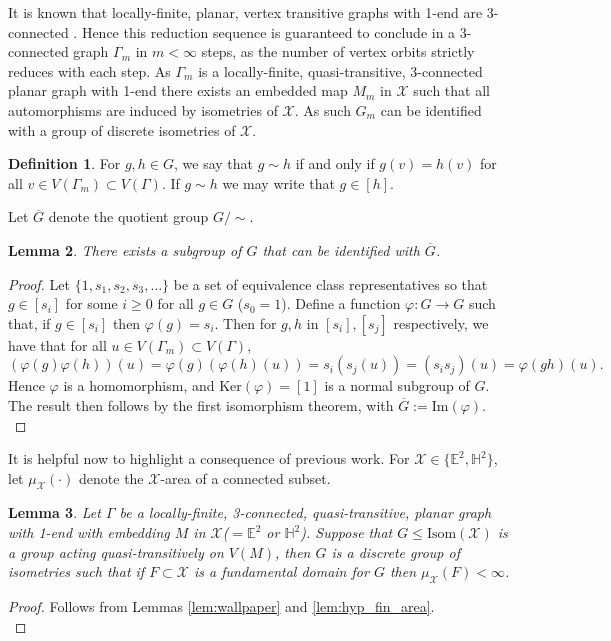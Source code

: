 \documentclass{article}
\numberwithin{equation}{section}
\newcommand{\EE}{\mathbb{E}}
\newcommand{\HH}{\mathbb{H}}
\newtheorem{lemma}{Lemma}[section]
\theoremstyle{definition}
\newtheorem{definition}[lemma]{Definition}
\theoremstyle{remark}
\begin{document}
It is known that locally-finite, planar, vertex transitive graphs with 1-end are 3-connected \cite[Theorem 1]{Babai1975}. Hence this reduction sequence is guaranteed to conclude in a 3-connected graph $\Gamma_m$ in $m<\infty$ steps, as the number of vertex orbits strictly reduces with each step. As $\Gamma_m$ is a locally-finite, quasi-transitive, 3-connected planar graph with 1-end there exists an embedded map $M_m$ in $\mathcal{X}$ such that all automorphisms are induced by isometries of $\mathcal{X}$. As such $G_m$ can be identified with a group of discrete isometries of $\mathcal{X}$.

\begin{definition}
For $g,h\in G$, we say that $g\sim h$ if and only if $g(v)=h(v)$ for all $v\in V(\Gamma_m)\subset V(\Gamma)$. If $g\sim h$ we may write that $g\in[h]$.
\end{definition}
Let $\overline{G}$ denote the quotient group $G/\sim$.
\begin{lemma}\label{lem:subgroup_of_G}
    There exists a subgroup of $G$ that can be identified with $\overline{G}$.
\end{lemma}
\begin{proof}
Let $\{1,s_1,s_2,s_3,\ldots\}$ be a set of equivalence class representatives so that $g\in[s_i]$ for some $i\geq 0$ for all $g\in G$ ($s_0=1$). Define a function $\varphi:G\rightarrow G$ such that, if $g\in[s_i]$ then $\varphi(g)=s_i$. Then for $g,h$ in $[s_i],[s_j]$ respectively, we have that for all $u\in V(\Gamma_m)\subset V(\Gamma)$, 
$$(\varphi(g)\varphi(h))(u)=\varphi(g)(\varphi(h)(u))=s_i(s_j(u))=(s_is_j)(u)=\varphi(gh)(u).$$
Hence $\varphi$ is a homomorphism, and $\text{Ker}(\varphi)=[1]$ is a normal subgroup of $G$.
   The result then follows by the first isomorphism theorem, with $\overline{G}:=\text{Im}(\varphi)$.\\
\end{proof}

It is helpful now to highlight a consequence of previous work. For $\mathcal{X}\in\{\EE^2,\HH^2\}$, let $\mu_\mathcal{X}(\cdot)$ denote the $\mathcal{X}$-area of a connected subset. 
\begin{lemma}\label{lem:fin_area_action_only}
    Let $\Gamma$ be a locally-finite, 3-connected, quasi-transitive, planar graph with 1-end with embedding $M$ in $\mathcal{X}$($=\EE^2$ or $\HH^2$). Suppose that $G\leq \text{Isom}(\mathcal{X})$ is a group acting quasi-transitively on $V(M)$, then $G$ is a discrete group of isometries such that if $F\subset\mathcal{X}$ is a fundamental domain for $G$ then $\mu_\mathcal{X}(F)<\infty$.
\end{lemma}
\begin{proof}
  Follows from Lemmas \ref{lem:wallpaper} and \ref{lem:hyp_fin_area}.\\
\end{proof}
\end{document}
